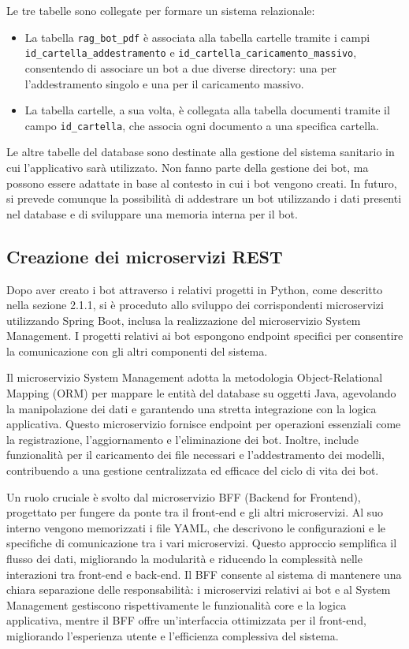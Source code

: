 \documentclass[a4paper,twoside,12pt]{toptesi}
\begin{document}
Le tre tabelle sono collegate per formare un sistema relazionale:
\begin{itemize}
\raggedright
\item La tabella \textnormal{\lstinline|rag_bot_pdf|} è associata alla tabella cartelle tramite i campi \textnormal{\lstinline|id_cartella_addestramento|} e \textnormal{\lstinline|id_cartella_caricamento_massivo|}, consentendo di associare un bot a due diverse directory: una per l'addestramento singolo e una per il caricamento massivo.
\item La tabella cartelle, a sua volta, è collegata alla tabella documenti tramite il campo \textnormal{\lstinline|id_cartella|}, che associa ogni documento a una specifica cartella.
\end{itemize}

Le altre tabelle del database sono destinate alla gestione del sistema sanitario in cui l'applicativo sarà utilizzato. Non fanno parte della gestione dei bot, ma possono essere adattate in base al contesto in cui i bot vengono creati. In futuro, si prevede comunque la possibilità di addestrare un bot utilizzando i dati presenti nel database e di sviluppare una memoria interna per il bot.

\subsection{Creazione dei microservizi REST}

Dopo aver creato i bot attraverso i relativi progetti in Python, come descritto nella sezione 2.1.1, si è proceduto allo sviluppo dei corrispondenti microservizi utilizzando Spring Boot, inclusa la realizzazione del microservizio System Management. I progetti relativi ai bot espongono endpoint specifici per consentire la comunicazione con gli altri componenti del sistema.

Il microservizio System Management adotta la metodologia Object-Relational Mapping (ORM) per mappare le entità del database su oggetti Java, agevolando la manipolazione dei dati e garantendo una stretta integrazione con la logica applicativa. Questo microservizio fornisce endpoint per operazioni essenziali come la registrazione, l'aggiornamento e l'eliminazione dei bot. Inoltre, include funzionalità per il caricamento dei file necessari e l'addestramento dei modelli, contribuendo a una gestione centralizzata ed efficace del ciclo di vita dei bot.

Un ruolo cruciale è svolto dal microservizio BFF (Backend for Frontend), progettato per fungere da ponte tra il front-end e gli altri microservizi. Al suo interno vengono memorizzati i file YAML, che descrivono le configurazioni e le specifiche di comunicazione tra i vari microservizi. Questo approccio semplifica il flusso dei dati, migliorando la modularità e riducendo la complessità nelle interazioni tra front-end e back-end. Il BFF consente al sistema di mantenere una chiara separazione delle responsabilità: i microservizi relativi ai bot e al System Management gestiscono rispettivamente le funzionalità core e la logica applicativa, mentre il BFF offre un'interfaccia ottimizzata per il front-end, migliorando l'esperienza utente e l'efficienza complessiva del sistema.
\end{document}
